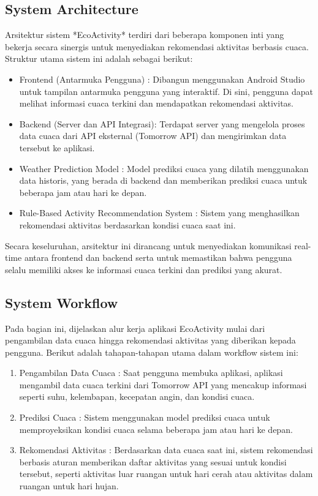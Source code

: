 \documentclass[journal,article,submit,pdftex,moreauthors]{Definitions/mdpi}
\begin{document}
\subsection{System Architecture}

Arsitektur sistem *EcoActivity* terdiri dari beberapa komponen inti yang bekerja secara sinergis untuk menyediakan rekomendasi aktivitas berbasis cuaca. Struktur utama sistem ini adalah sebagai berikut:

\begin{itemize}
    \item Frontend (Antarmuka Pengguna) : Dibangun menggunakan Android Studio untuk tampilan antarmuka pengguna yang interaktif. Di sini, pengguna dapat melihat informasi cuaca terkini dan mendapatkan rekomendasi aktivitas.
    \item Backend (Server dan API Integrasi): Terdapat server yang mengelola proses data cuaca dari API eksternal (Tomorrow API) dan mengirimkan data tersebut ke aplikasi.
    \item Weather Prediction Model : Model prediksi cuaca yang dilatih menggunakan data historis, yang berada di backend dan memberikan prediksi cuaca untuk beberapa jam atau hari ke depan.
    \item Rule-Based Activity Recommendation System : Sistem yang menghasilkan rekomendasi aktivitas berdasarkan kondisi cuaca saat ini.
\end{itemize}

Secara keseluruhan, arsitektur ini dirancang untuk menyediakan komunikasi real-time antara frontend dan backend serta untuk memastikan bahwa pengguna selalu memiliki akses ke informasi cuaca terkini dan prediksi yang akurat.


\subsection{System Workflow}

Pada bagian ini, dijelaskan alur kerja aplikasi EcoActivity mulai dari pengambilan data cuaca hingga rekomendasi aktivitas yang diberikan kepada pengguna. Berikut adalah tahapan-tahapan utama dalam workflow sistem ini:

\begin{enumerate}
    \item Pengambilan Data Cuaca : Saat pengguna membuka aplikasi, aplikasi mengambil data cuaca terkini dari Tomorrow API yang mencakup informasi seperti suhu, kelembapan, kecepatan angin, dan kondisi cuaca.
    \item Prediksi Cuaca : Sistem menggunakan model prediksi cuaca untuk memproyeksikan kondisi cuaca selama beberapa jam atau hari ke depan.
    \item Rekomendasi Aktivitas : Berdasarkan data cuaca saat ini, sistem rekomendasi berbasis aturan memberikan daftar aktivitas yang sesuai untuk kondisi tersebut, seperti aktivitas luar ruangan untuk hari cerah atau aktivitas dalam ruangan untuk hari hujan.
\end{enumerate}
\end{document}
